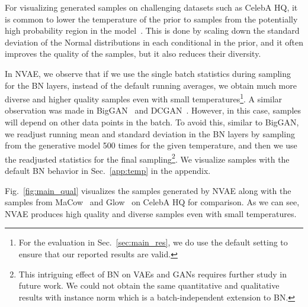 \documentclass{article}
\begin{document}
For visualizing generated samples on challenging datasets such as CelebA HQ, it is common to lower the temperature of the prior to samples from the potentially high probability region in the model~\cite{kingma2018glow}. This is done by scaling down the standard deviation of the Normal distributions in each conditional in the prior, and it often improves the quality of the samples, but it also reduces their diversity.

In NVAE, we observe that if we use the single batch statistics during sampling for the BN layers, instead of the default running averages, we obtain much more diverse and higher quality samples even with small temperatures\footnote{For the evaluation in Sec.~\ref{sec:main_res}, we do use the default setting to ensure that our reported results are valid.}. A similar observation was made in BigGAN~\cite{brock2018biggan} and DCGAN~\cite{radford2015dcgan}. However, in this case, samples will depend on other data points in the batch. To avoid this, similar to BigGAN, we readjust running mean and standard deviation in the BN layers by sampling from the generative model 500 times for the given temperature, and then we use the readjusted statistics for the final sampling\footnote{This intriguing effect of BN on VAEs and GANs requires further study in future work. We could not obtain the same quantitative and qualitative results with instance norm which is a batch-independent extension to BN.}. We visualize samples with the default BN behavior in Sec.~\ref{app:temp} in the appendix.

Fig.~\ref{fig:main_qual} visualizes the samples generated by NVAE along with the samples from MaCow~\cite{ma19MaCow} and Glow~\cite{kingma2018glow} on CelebA HQ for comparison. As we can see, NVAE produces high quality and diverse samples even with small temperatures. 
\end{document}
